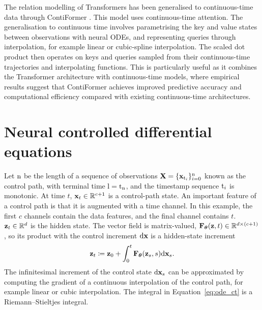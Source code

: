 The relation modelling of Transformers has been generalised to continuous-time data through ContiFormer \citep{chen2023contiformer}. This model uses continuous-time attention. The generalisation to continuous time involves parametrising the key and value states between observations with neural \acp{ODE}, and representing queries through interpolation, for example linear or cubic-spline interpolation. The scaled dot product then operates on keys and queries sampled from their continuous-time trajectories and interpolating functions. This is particularly useful as it combines the Transformer architecture with continuous-time models, where empirical results suggest that ContiFormer achieves improved predictive accuracy and computational efficiency compared with existing continuous-time architectures.





\section{Neural controlled differential equations}
Let ${\textnormal{n}}$ be the length of a sequence of observations ${\mathbf{X}}=\{{\mathbf{x}}_{{\textnormal{t}}_i}\}_{i=0}^{\textnormal{n}}$ known as the control path, with terminal time ${\textnormal{l}}={\textnormal{t}}_{\textnormal{n}}$, and the timestamp sequence ${\textnormal{t}}_i$ is monotonic. At time $t$, ${\mathbf{x}}_t\in\mathbb R^{c+1}$ is a control-path state. An important feature of a control path is that it is augmented with a time channel. In this example, the first $c$ channels contain the data features, and the final channel contains $t$. ${\mathbf{z}}_t\in\mathbb R^d$ is the hidden state. The vector field is matrix-valued, ${\mathbf{F}}_{\bm{\theta}}({\mathbf{z}},t)\in\mathbb R^{d\times(c+1)}$, so its product with the control increment $\mathrm{d}{\mathbf{x}}$ is a hidden-state increment
\[
{\mathbf{z}}_t \coloneqq {\mathbf{z}}_0 + \int_0^t{\mathbf{F}}_{\bm{\theta}}({\mathbf{z}}_s,s)\mathrm{d}{\mathbf{x}}_s.
\label{eq:ode_ct}
\]
The infinitesimal increment of the control state $\mathrm{d} {\mathbf{x}}_s$ can be approximated by computing the gradient of a continuous interpolation of the control path, for example linear or cubic interpolation. The integral in Equation~\ref{eq:ode_ct} is a Riemann--Stieltjes integral.


